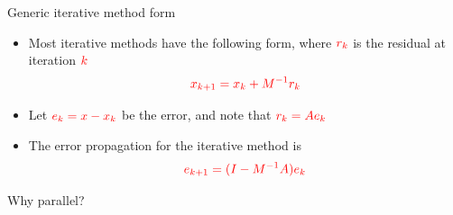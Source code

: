 \documentclass[12pt]{beamer}
\newcommand{\re}[1]{{\textcolor{red}       {#1}}}
\begin{document}
\begin{frame}{Generic iterative method form}
\begin{itemize}
  \item Most iterative methods have the following form, where $\re{r_k}$ is the residual at iteration $\re{k}$
  $$\re{x_{k+1} = x_k + M^{-1}r_k}$$
  \item Let $\re{e_k =x - x_k}$ be the error, and note that $\re{r_k = Ae_k}$
  \item The error propagation for the iterative method is
  $$\re{e_{k+1} = (I-M^{-1}A)e_k}$$
\end{itemize}
\end{frame}

\begin{frame}{Why parallel?}


\end{frame}
\end{document}
